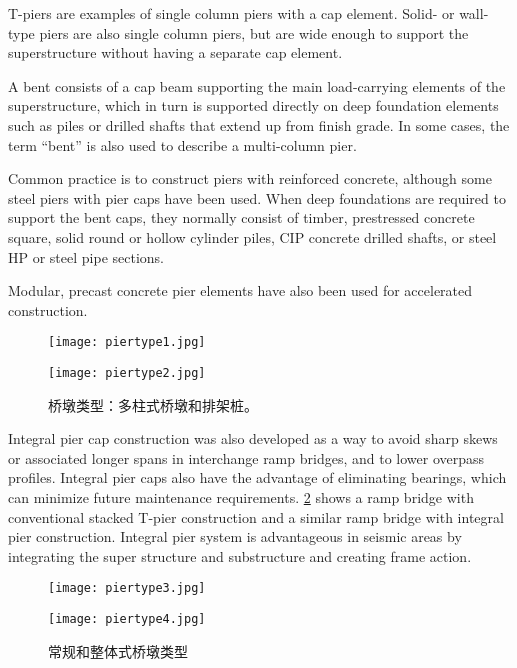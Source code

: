 T-piers are examples of single column piers with a cap element. Solid- or wall-type piers are also single column piers, but are wide enough to support the superstructure without having a separate cap element.

A bent consists of a cap beam supporting the main load-carrying elements of the superstructure, which in turn is supported directly on deep foundation elements such as piles or drilled shafts that extend up from finish grade. In some cases, the term “bent” is also used to describe a multi-column pier.

Common practice is to construct piers with reinforced concrete, although some steel piers with pier caps have been used. When deep foundations are required to support the bent caps, they normally consist of timber, prestressed concrete square, solid round or hollow cylinder piles, CIP concrete drilled shafts, or steel HP or steel pipe sections.

Modular, precast concrete pier elements have also been used for accelerated construction.

\begin{figure}
  \begin{minipage}{0.48\linewidth}\centering
    \texttt{[image: piertype1.jpg]}
  \end{minipage}\hfil
  \begin{minipage}{0.48\linewidth}\centering
    \texttt{[image: piertype2.jpg]}
  \end{minipage}
  \caption{桥墩类型：多柱式桥墩和排架桩。}
  \label{fig:piertypes-multi}
\end{figure}

Integral pier cap construction was also developed as a way to avoid sharp skews or associated longer spans in interchange ramp bridges, and to lower overpass profiles. Integral pier caps also have the advantage of eliminating bearings, which can minimize future maintenance requirements. \cref{fig:piertypes-integral} shows a ramp bridge with conventional stacked T-pier construction and a similar ramp bridge with integral pier construction. Integral pier system is advantageous in seismic areas by integrating the super structure and substructure and creating frame action.

\begin{figure}
  \begin{minipage}{0.48\linewidth}\centering
    \texttt{[image: piertype3.jpg]}
  \end{minipage}\hfil
  \begin{minipage}{0.48\linewidth}\centering
    \texttt{[image: piertype4.jpg]}
  \end{minipage}
  \caption{常规和整体式桥墩类型}
  \label{fig:piertypes-integral}
\end{figure}

